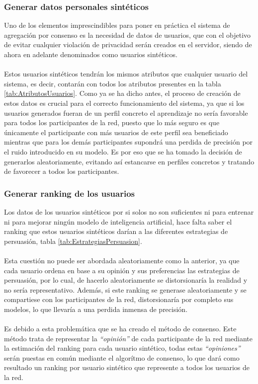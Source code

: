 \subsubsection{Generar datos personales sintéticos}\label{Consenso:Usuarios_Sinteticos}
Uno de los elementos imprescindibles para poner en práctica el sistema de agregación por consenso es la necesidad de datos de usuarios, que con el objetivo de evitar cualquier violación de privacidad serán creados en el servidor, siendo de ahora en adelante denominados como usuarios sintéticos.
\\ \\
Estos usuarios sintéticos tendrán los mismos atributos que cualquier usuario del sistema, es decir, contarán con todos los atributos presentes en la tabla \ref{tab:AtributosUsuarios}. Como ya se ha dicho antes, el proceso de creación de estos datos es crucial para el correcto funcionamiento del sistema, ya que si los usuarios generados fueran de un perfil concreto el aprendizaje no sería favorable para todos los participantes de la red, puesto que lo más seguro es que únicamente el participante con más usuarios de este perfil sea beneficiado mientras que para los demás participantes supondrá una perdida de precisión por el ruido introducido en su modelo. Es por eso que se ha tomado la decisión de generarlos aleatoriamente, evitando así estancarse en perfiles concretos y tratando de favorecer a todos los participantes. 
\subsubsection{Generar ranking de los usuarios}
Los datos de los usuarios sintéticos por si solos no son suficientes ni para entrenar ni para mejorar ningún modelo de inteligencia artificial, hace falta saber el ranking que estos usuarios sintéticos darían a las diferentes estrategias de persuasión, tabla \ref{tab:EstrategiasPersuasion}. 
\\ \\
Esta cuestión no puede ser abordada aleatoriamente como la anterior, ya que cada usuario ordena en base a su opinión y sus preferencias las estrategias de persuasión, por lo cual, de hacerlo aleatoriamente se distorsionaría la realidad y no sería representativo. Además, si este ranking se generase aleatoriamente y se compartiese con los participantes de la red, distorsionaría por completo sus modelos, lo que llevaría a una perdida inmensa de precisión. 
\\ \\
Es debido a esta problemática que se ha creado el método de consenso. Este método trata de representar la \textit{``opinión''} de cada participante de la red mediante la estimación del ranking para cada usuario sintético, todas estas \textit{``opiniones''} serán puestas en común mediante el algorítmo de consenso, lo que dará como resultado un ranking por usuario sintético que represente a todos los usuarios de la red.
\newpage
